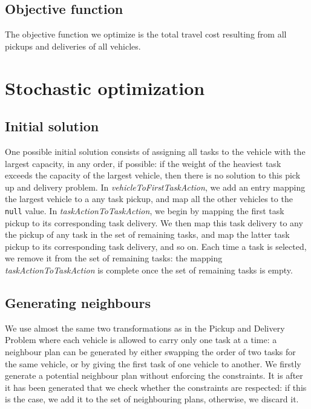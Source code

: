 \documentclass[10pt]{article}
\begin{document}
\subsection{Objective function}
The objective function we optimize is the total travel cost resulting from all pickups and deliveries of all vehicles.

\section{Stochastic optimization}

\subsection{Initial solution}
One possible initial solution consists of assigning all tasks to the vehicle with the largest capacity, in any order, if possible: if the weight of the heaviest task exceeds the capacity of the largest vehicle, then there is no solution to this pick up and delivery problem.
In \textit{vehicleToFirstTaskAction}, we add an entry mapping the largest vehicle to a any task pickup, and map all the other vehicles to the \texttt{null} value.
In \textit{taskActionToTaskAction}, we begin by mapping the first task pickup to its corresponding task delivery. We then map this task delivery to any the pickup of any task in the set of remaining tasks, and map the latter task pickup to its corresponding task delivery, and so on.
Each time a task is selected, we remove it from the set of remaining tasks: the mapping \textit{taskActionToTaskAction} is complete once the set of remaining tasks is empty.

\subsection{Generating neighbours}
We use almost the same two transformations as in the Pickup and Delivery Problem where each vehicle is allowed to carry only one task at a time: a neighbour plan can be generated by either swapping the order of two tasks for the same vehicle, or by giving the first task of one vehicle to another.
We firstly generate a potential neighbour plan without enforcing the constraints. It is after it has been generated that we check whether the constraints are respected: if this is the case, we add it to the set of neighbouring plans, otherwise, we discard it.
\end{document}
